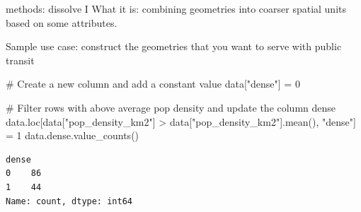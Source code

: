 \documentclass[
  ignorenonframetext,
]{beamer}
\newenvironment{Shaded}{\begin{snugshade}}{\end{snugshade}}
\newcommand{\CommentTok}[1]{\textcolor[rgb]{0.37,0.37,0.37}{#1}}
\newcommand{\DecValTok}[1]{\textcolor[rgb]{0.68,0.00,0.00}{#1}}
\newcommand{\NormalTok}[1]{\textcolor[rgb]{0.00,0.23,0.31}{#1}}
\newcommand{\OperatorTok}[1]{\textcolor[rgb]{0.37,0.37,0.37}{#1}}
\newcommand{\StringTok}[1]{\textcolor[rgb]{0.13,0.47,0.30}{#1}}
\begin{document}
\begin{frame}[fragile]{methods: dissolve I}
\label{methods-dissolve-i}
What it is: combining geometries into coarser spatial units based on
some attributes.

Sample use case: construct the geometries that you want to serve with
public transit

\begin{Shaded}
\begin{Highlighting}[]
\CommentTok{\# Create a new column and add a constant value}
\NormalTok{data[}\StringTok{"dense"}\NormalTok{] }\OperatorTok{=} \DecValTok{0}

\CommentTok{\# Filter rows with above average pop density and update the column dense}
\NormalTok{data.loc[data[}\StringTok{"pop\_density\_km2"}\NormalTok{] }\OperatorTok{\textgreater{}}\NormalTok{ data[}\StringTok{"pop\_density\_km2"}\NormalTok{].mean(), }\StringTok{"dense"}\NormalTok{] }\OperatorTok{=} \DecValTok{1}
\NormalTok{data.dense.value\_counts()}
\end{Highlighting}
\end{Shaded}

\begin{verbatim}
dense
0    86
1    44
Name: count, dtype: int64
\end{verbatim}
\end{frame}
\end{document}
